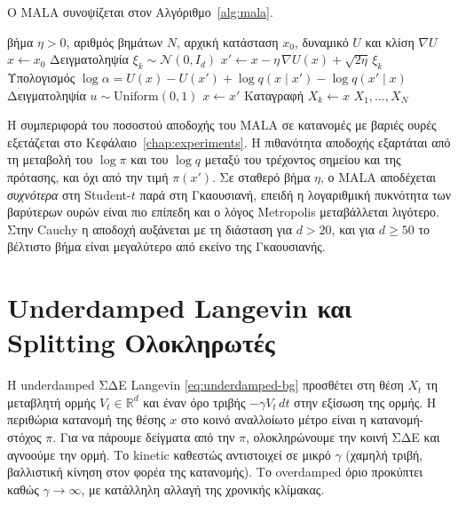 Ο MALA συνοψίζεται στον Αλγόριθμο~\ref{alg:mala}.

\begin{algorithm}[ht]
\caption{Metropolis-Adjusted Langevin Algorithm (MALA)}
\label{alg:mala}
\begin{algorithmic}[1]
\Require βήμα $\eta > 0$, αριθμός βημάτων $N$, αρχική κατάσταση $x_0$, δυναμικό $U$ και κλίση $\nabla U$
\State $x \gets x_0$
  \State Δειγματοληψία $\xi_k \sim \mathcal{N}(0, I_d)$
  \State $x' \gets x - \eta\, \nabla U(x) + \sqrt{2\eta}\, \xi_k$ 
  \State Υπολογισμός $\log \alpha = U(x) - U(x') + \log q(x \mid x') - \log q(x' \mid x)$
  \State Δειγματοληψία $u \sim \mathrm{Uniform}(0,1)$
    \State $x \gets x'$ 
  \EndIf
  \State Καταγραφή $X_k \gets x$
\EndFor
\State \Return $X_1, \ldots, X_N$
\end{algorithmic}
\end{algorithm}

Η συμπεριφορά του ποσοστού αποδοχής του MALA σε κατανομές με βαριές ουρές
εξετάζεται στο Κεφάλαιο~\ref{chap:experiments}. Η πιθανότητα αποδοχής εξαρτάται από τη μεταβολή του $\log\pi$ και του
$\log q$ μεταξύ του τρέχοντος σημείου και της πρότασης, και όχι από την τιμή
$\pi(x')$. Σε σταθερό βήμα $\eta$, ο MALA αποδέχεται
\emph{συχνότερα} στη Student-$t$ παρά στη Γκαουσιανή, επειδή η λογαριθμική
πυκνότητα των βαρύτερων ουρών είναι πιο επίπεδη και ο λόγος Metropolis μεταβάλλεται
λιγότερο. Στην Cauchy η αποδοχή αυξάνεται με τη διάσταση για $d > 20$, και για
$d \ge 50$ το βέλτιστο βήμα είναι μεγαλύτερο από εκείνο της Γκαουσιανής.

\section{Underdamped Langevin και Splitting Ολοκληρωτές}
\label{sec:alg-kinetic}

Η underdamped ΣΔΕ Langevin \eqref{eq:underdamped-bg} προσθέτει στη θέση $X_t$ τη
μεταβλητή ορμής $V_t \in \mathbb{R}^d$ και έναν όρο τριβής $-\gamma V_t \, dt$ στην
εξίσωση της ορμής. Η περιθώρια κατανομή της θέσης $x$ στο κοινό αναλλοίωτο
μέτρο είναι η κατανομή-στόχος $\pi$. Για να πάρουμε δείγματα από την $\pi$,
ολοκληρώνουμε την κοινή ΣΔΕ και αγνοούμε την ορμή. Το kinetic καθεστώς
αντιστοιχεί σε μικρό $\gamma$ (χαμηλή τριβή, βαλλιστική κίνηση στον φορέα της
κατανομής). Το overdamped όριο προκύπτει καθώς $\gamma \to \infty$, με κατάλληλη
αλλαγή της χρονικής κλίμακας.

